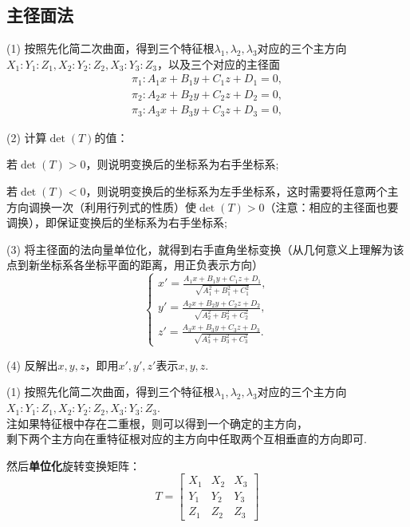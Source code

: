 \subsection{主径面法}
\vspace*{1em}
\par (1) 按照\link[化简二次曲面的具体方法]先化简二次曲面，得到三个特征根$\lambda_1,\lambda_2,\lambda_3$对应的三个主方向$X_1:Y_1:Z_1,X_2:Y_2:Z_2,X_3:Y_3:Z_3$，以及三个对应的主径面
\begin{equation*}
\begin{array}{c}
\pi_1 : A_1x+B_1y+C_1z+D_1=0,\\
\pi_2 : A_2x+B_2y+C_2z+D_2=0,\\
\pi_3 : A_3x+B_3y+C_3z+D_3=0,
\end{array}
\end{equation*}

\par (2) 计算$\det(T)$的值：
\par \kg \kg 若$\det(T)>0$，则说明变换后的坐标系为右手坐标系;
\par \kg \kg 若$\det(T)<0$，则说明变换后的坐标系为左手坐标系，这时需要将任意两个主方向调换一次（利用行列式的性质）使$\det(T)>0$（{\color{dy}注意：相应的主径面也要调换}），即保证变换后的坐标系为右手坐标系;

\par (3) 将主径面的法向量单位化，就得到右手直角坐标变换（从几何意义上理解为该点到新坐标系各坐标平面的距离，用正负表示方向）
\begin{equation*}
	\begin{cases}
	\displaystyle x'=\frac{A_1x+B_1y+C_1z+D_1}{\sqrt{A_1^2+B_1^2+C_1^2}}, \\
	\displaystyle y'=\frac{A_2x+B_2y+C_2z+D_2}{\sqrt{A_2^2+B_2^2+C_2^2}}, \\
	\displaystyle z'=\frac{A_3x+B_3y+C_3z+D_3}{\sqrt{A_3^2+B_3^2+C_3^2}}.
	\end{cases}
\end{equation*}
\par (4) 反解出$x,y,z$，即用$x',y',z'$表示$x,y,z$.

\vspace*{0.5em}

\par (1) 按照\link[化简二次曲面的具体方法]先化简二次曲面，得到三个特征根$\lambda_1,\lambda_2,\lambda_3$对应的三个主方向$X_1:Y_1:Z_1,X_2:Y_2:Z_2,X_3:Y_3:Z_3$.\\
{\color{dy} 注\kg 如果特征根中存在二重根，则可以得到一个确定的主方向，
	\\ \kg \kg 剩下两个主方向在重特征根对应的主方向中任取两个互相垂直的方向即可.}
\par 然后\textbf{单位化}旋转变换矩阵：
\begin{equation}
T=
\left[ 
\begin{array}{ccc}
X_1 & X_2 & X_3\\
Y_1 & Y_2 & Y_3\\
Z_1 & Z_2 & Z_3
\end{array}
\right] 
\end{equation}

